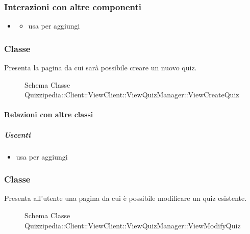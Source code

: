\subsubsection{Interazioni con altre componenti}
\begin{itemize}
\item {}
\begin{itemize}
\item usa  per aggiungi
\end{itemize}
\end{itemize}
\subsubsection{Classe }
Presenta la pagina da cui sarà possibile creare un nuovo quiz.
\begin{figure}[H]
\centering
\noindent{}
\caption[Schema Classe ViewCreateQuiz]{Schema Classe Quizzipedia::Client::ViewClient::ViewQuizManager::ViewCreateQuiz}
\end{figure}
\paragraph{Relazioni con altre classi}
\subparagraph{Uscenti}
\begin{itemize}
\item usa  per aggiungi
\end{itemize}
\subsubsection{Classe }
Presenta all'utente una pagina da cui è possibile modificare un quiz esistente.
\begin{figure}[H]
\centering
\noindent{}
\caption[Schema Classe ViewModifyQuiz]{Schema Classe Quizzipedia::Client::ViewClient::ViewQuizManager::ViewModifyQuiz}
\end{figure}

